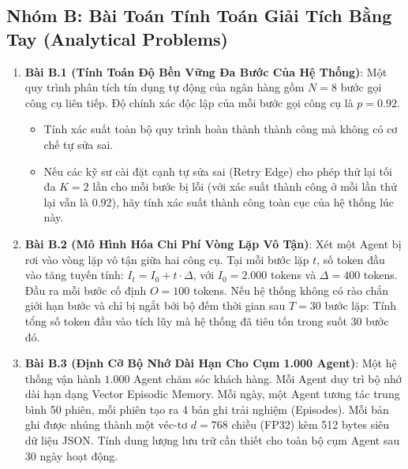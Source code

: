 \subsection{Nhóm B: Bài Toán Tính Toán Giải Tích Bằng Tay (Analytical Problems)}
\begin{enumerate}
  \item \textbf{Bài B.1 (Tính Toán Độ Bền Vững Đa Bước Của Hệ Thống)}:
  Một quy trình phân tích tín dụng tự động của ngân hàng gồm $N = 8$ bước gọi công cụ liên tiếp.
  Độ chính xác độc lập của mỗi bước gọi công cụ là $p = 0.92$.
  \begin{itemize}
    \item[a)] Tính xác suất toàn bộ quy trình hoàn thành thành công mà không có cơ chế tự sửa sai.
    \item[b)] Nếu các kỹ sư cài đặt cạnh tự sửa sai (Retry Edge) cho phép thử lại tối đa $K = 2$ lần cho mỗi bước bị lỗi (với xác suất thành công ở mỗi lần thử lại vẫn là $0.92$), hãy tính xác suất thành công toàn cục của hệ thống lúc này.
  \end{itemize}

  \item \textbf{Bài B.2 (Mô Hình Hóa Chi Phí Vòng Lặp Vô Tận)}:
  Xét một Agent bị rơi vào vòng lặp vô tận giữa hai công cụ.
  Tại mỗi bước lặp $t$, số token đầu vào tăng tuyến tính: $I_t = I_0 + t \cdot \Delta$, với $I_0 = 2.000$ tokens và $\Delta = 400$ tokens. Đầu ra mỗi bước cố định $O = 100$ tokens.
  Nếu hệ thống không có rào chắn giới hạn bước và chỉ bị ngắt bởi bộ đếm thời gian sau $T = 30$ bước lặp:
  Tính tổng số token đầu vào tích lũy mà hệ thống đã tiêu tốn trong suốt 30 bước đó.

  \item \textbf{Bài B.3 (Định Cỡ Bộ Nhớ Dài Hạn Cho Cụm 1.000 Agent)}:
  Một hệ thống vận hành $1.000$ Agent chăm sóc khách hàng. Mỗi Agent duy trì bộ nhớ dài hạn dạng Vector Episodic Memory.
  Mỗi ngày, một Agent tương tác trung bình 50 phiên, mỗi phiên tạo ra 4 bản ghi trải nghiệm (Episodes).
  Mỗi bản ghi được nhúng thành một véc-tơ $d = 768$ chiều (FP32) kèm 512 bytes siêu dữ liệu JSON.
  Tính dung lượng lưu trữ cần thiết cho toàn bộ cụm Agent sau 30 ngày hoạt động.


\end{enumerate}
